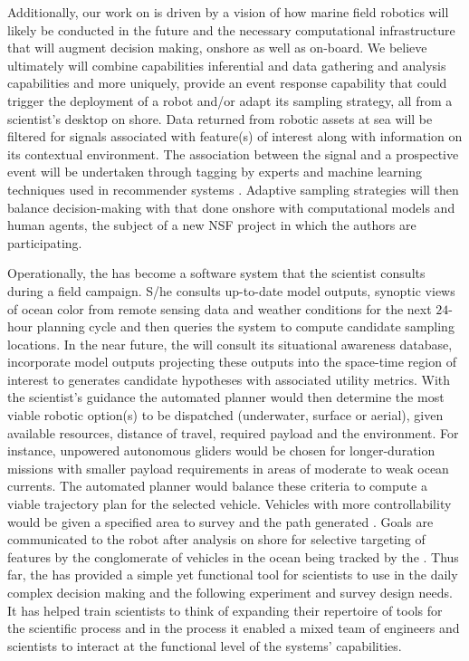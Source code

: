 Additionally, our work on \od is driven by a vision of how marine
field robotics will likely be conducted in the future and the
necessary computational infrastructure that will augment decision
making, onshore as well as on-board. We believe ultimately \od will
combine capabilities inferential and data gathering and analysis
capabilities and more uniquely, provide an event response capability
that could trigger the deployment of a robot and/or adapt its sampling
strategy, all from a scientist's desktop on shore. Data returned from
robotic assets at sea will be filtered for signals associated with
feature(s) of interest along with information on its contextual
environment. The association between the signal and a prospective
event will be undertaken through tagging by experts and machine
learning techniques used in recommender systems
\cite{Adomavicius05}. Adaptive sampling strategies will then balance
decision-making \situ with that done onshore with computational models
and human agents, the subject of a new NSF project in which the
authors are participating.


Operationally, the \od has become a software system that the
scientist consults during a \can field campaign. S/he consults
up-to-date model outputs, synoptic views of ocean color from remote
sensing data and weather conditions for the next $24$-hour planning
cycle and then queries the system to compute candidate sampling
locations. In the near future, the \od will consult its situational
awareness database, incorporate model outputs projecting these outputs
into the space-time region of interest to generates candidate
hypotheses with associated utility metrics. With the scientist's
guidance the automated planner would then determine the most viable
robotic option(s) to be dispatched (underwater, surface or aerial),
given available resources, distance of travel, required payload and
the environment. For instance, unpowered autonomous gliders would be
chosen for longer-duration missions with smaller payload requirements
in areas of moderate to weak ocean currents. The automated planner
would balance these criteria to compute a viable trajectory plan for
the selected vehicle. Vehicles with more controllability would be
given a specified area to survey and the path generated \situ. Goals
are communicated to the robot after analysis on shore for selective
targeting of features by the conglomerate of vehicles in the ocean
being tracked by the \od. Thus far, the \od has provided a simple
yet functional tool for scientists to use in the daily complex
decision making and the following experiment and survey design
needs. It has helped train scientists to think of expanding their
repertoire of tools for the scientific process and in the process it
enabled a mixed team of engineers and scientists to interact at the
functional level of the systems' capabilities.

